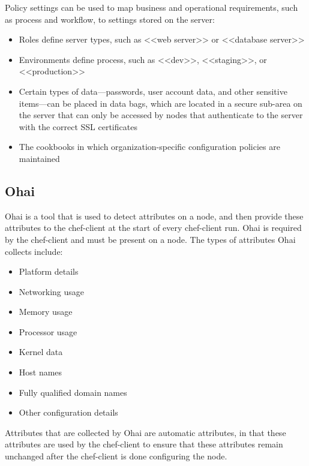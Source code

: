 Policy settings can be used to map business and operational requirements, such as process and workflow, to settings stored on the server:

\begin{itemize}
  \item Roles define server types, such as <<web server>> or <<database server>>
  \item Environments define process, such as <<dev>>, <<staging>>, or <<production>>
  \item Certain types of data—passwords, user account data, and other sensitive items—can be placed in data bags, which are located in a secure sub-area on the server that can only be accessed by nodes that authenticate to the server with the correct SSL certificates
  \item The cookbooks in which organization-specific configuration policies are maintained
\end{itemize}

\subsection{Ohai}

Ohai is a tool that is used to detect attributes on a node, and then provide these attributes to the chef-client at the start of every chef-client run. Ohai is required by the chef-client and must be present on a node. The types of attributes Ohai collects include:

\begin{itemize}
  \item Platform details
  \item Networking usage
  \item Memory usage
  \item Processor usage
  \item Kernel data
  \item Host names
  \item Fully qualified domain names
  \item Other configuration details
\end{itemize}

Attributes that are collected by Ohai are automatic attributes, in that these attributes are used by the chef-client to ensure that these attributes remain unchanged after the chef-client is done configuring the node.
